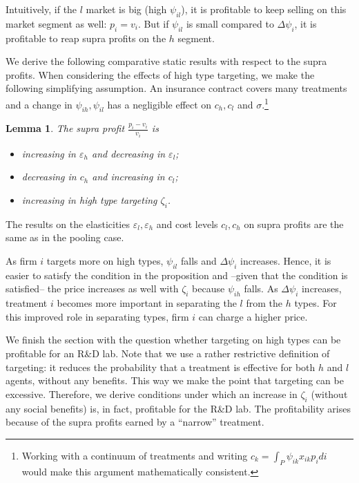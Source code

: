 \documentclass[a4paper,12pt]{article}
\newtheorem{lemma}{Lemma}
\begin{document}
Intuitively, if the \(l\) market is big (high \(\psi_{il}\)), it is profitable to keep selling on this market segment as well: \(p_i = v_i\). But if \(\psi_{il}\) is small compared to \(\Delta \psi_i\), it is profitable to reap supra profits on the \(h\) segment.

We derive the following comparative static results with respect to the supra profits. When considering the effects of high type targeting, we make the following simplifying assumption. An insurance contract covers many treatments and a change in \(\psi_{ih},\psi_{il}\) has a negligible effect on \(c_h, c_l\) and \(\sigma\).\footnote{Working with a continuum of treatments and writing \(c_k = \int_P \psi_{ik}x_{ik}p_idi\) would make this argument mathematically consistent.}

\begin{lemma}
\label{Linear_pricing_comparative_statics}
The supra profit \(\frac{p_i-v_i}{v_i}\) is
\begin{itemize}
\item increasing in \(\varepsilon_h\) and decreasing in \(\varepsilon_l\);
\item decreasing in \(c_h\) and increasing in \(c_l\);
\item increasing in high type targeting \(\zeta_i\).
\end{itemize}
\end{lemma}

The results on the elasticities \(\varepsilon_l, \varepsilon_h\) and cost levels \(c_l,c_h\) on supra profits are the same as in the pooling case.

As firm \(i\) targets more on high types, \(\psi_{il}\) falls and \(\Delta \psi_i\) increases. Hence, it is easier to satisfy the condition in the proposition and --given that the condition is satisfied-- the price increases as well with \(\zeta_i\) because \(\psi_{ih}\) falls. As \(\Delta \psi_i\) increases, treatment \(i\) becomes more important in separating the \(l\) from the \(h\) types. For this improved role in separating types, firm \(i\) can charge a higher price.

We finish the section with the question whether targeting on high types can be profitable for an R\&D lab. Note that we use a rather restrictive definition of targeting: it reduces the probability that a treatment is effective for both \(h\) and \(l\) agents, without any benefits. This way we make the point that targeting can be excessive. Therefore, we derive conditions under which an increase in \(\zeta_i\) (without any social benefits) is, in fact, profitable for the R\&D lab. The profitability arises because of the supra profits earned by a ``narrow'' treatment.
\end{document}
